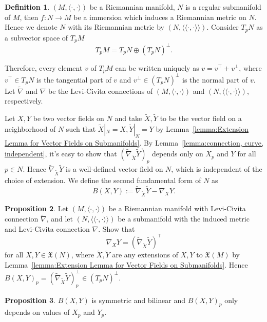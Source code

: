\documentclass[12pt,a4paper]{book}
\theoremstyle{definition}
\newtheorem{defn}{Definition}[section]
\newtheorem{prop}[defn]{Proposition}
\begin{document}
\begin{defn}
    $(M,\langle\cdot, \cdot\rangle)$ be a Riemannian manifold, $N$ is a regular submanifold of $M$, then $f:N\rightarrow M$ be a immersion which
    induces a Riemannian metric on $N$. Hence we denote $N$ with its Riemannian metric by $(N,\langle\langle\cdot, \cdot\rangle\rangle)$.
    Consider $T_pN$ as a subvector space of $T_pM$
    $$
        T_p M=T_p N \oplus\left(T_p N\right)^{\perp} .
    $$

    Therefore, every element $v$ of $T_p M$ can be written uniquely as $v=v^{\top}+v^{\perp}$, where $v^{\top} \in T_p N$
    is the tangential part of $v$ and $v^{\perp} \in\left(T_p N\right)^{\perp}$ is the normal part of $v$. Let $\widetilde{\nabla}$ and $\nabla$
    be the Levi-Civita connections of $(M,\langle\cdot, \cdot\rangle)$ and $(N,\langle\langle\cdot, \cdot\rangle\rangle)$,
    respectively.

    Let $X, Y$ be two vector fields on $N$ and take $\tilde{X}, \widetilde{Y}$ to be the vector field on a neighborhood of $N$ such that $\tilde{X}|_N=X,\tilde{Y}|_N=Y$
    by Lemma~\ref{lemma:Extension Lemma for Vector Fields on Submanifolds}. By Lemma~\ref{lemma:connection, curve, independent}, it's easy to show that $\left(\widetilde{\nabla}_{\widetilde{X}} \widetilde{Y}\right)_p$ depends only on $X_p$ and $Y$ for all $p\in N$.
    Hence $\widetilde{\nabla}_{\widetilde{X}} \widetilde{Y}$ is a well-defined vector field on $N$, which is independent of the choice of extension.
    We define the second fundamental form of $N$ as
    $$
        B(X, Y):=\widetilde{\nabla}_{\widetilde{X}} \widetilde{Y}-\nabla_X Y .
    $$
\end{defn}
\begin{prop}
    Let $(M,\langle\cdot, \cdot\rangle)$ be a Riemannian manifold with Levi-Civita
    connection $\widetilde{\nabla}$, and let $(N,\langle\langle\cdot, \cdot\rangle\rangle)$ be a submanifold with the induced metric and Levi-Civita connection $\nabla$.
    Show that
    $$
        \nabla_X Y=\left(\widetilde{\nabla}_{\widetilde{X}} \widetilde{Y}\right)^{\top}
    $$
    for all $X, Y \in \mathfrak{X}(N)$, where $\tilde{X}, \tilde{Y}$ are any extensions of $X, Y$ to $\mathfrak{X}(M)$ by Lemma~\ref{lemma:Extension Lemma for Vector Fields on Submanifolds}.
    Hence
    $B(X,Y)_p=(\widetilde{\nabla}_{\widetilde{X}} \widetilde{Y})_p^{\perp}  \in \left(T_p N\right)^{\perp}$.

\end{prop}
\begin{prop}
    $B(X,Y)$ is symmetric and bilinear and $B(X,Y)_p$ only depends on values of $X_p$ and $Y_p$.
\end{prop}
\end{document}
